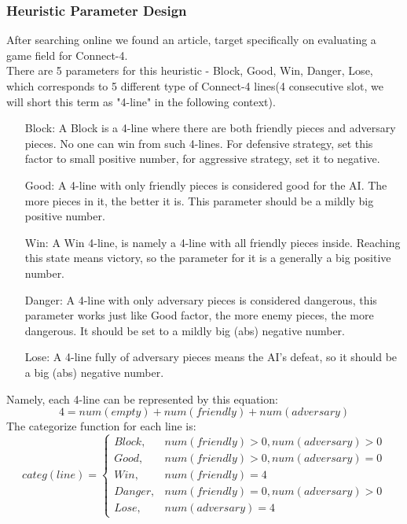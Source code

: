 \documentclass[12pt,a4paper]{article}
\begin{document}
	\subsubsection{Heuristic Parameter Design}
	After searching online we found an article, target specifically on evaluating a game field for Connect-4.\\
	
	There are 5 parameters for this heuristic - Block, Good, Win, Danger, Lose, which corresponds to 5 different type of Connect-4 lines(4 consecutive slot, we will short this term as "4-line" in the following context).\\
	
	
	\begin{enumerate}
		\item [Block:] A Block is a 4-line where there are both friendly pieces and adversary pieces. No one can win from such 4-lines. For defensive strategy, set this factor to small positive number, for aggressive strategy, set it to negative.
		\item [Good:] A 4-line with only friendly pieces is considered good for the AI. The more pieces in it, the better it is. This parameter should be a mildly big positive number.
		\item [Win:] A Win 4-line, is namely a 4-line with all friendly pieces inside. Reaching this state means victory, so the parameter for it is a generally a big positive number.
		\item [Danger:] A 4-line with only adversary pieces is considered dangerous, this parameter works just like Good factor, the more enemy pieces, the more dangerous. It should be set to a mildly big (abs) negative number.
		\item [Lose:] A 4-line fully of adversary pieces means the AI's defeat, so it should be a big (abs) negative number.
	\end{enumerate}

	Namely, each 4-line can be represented by this equation:
	\begin{displaymath}
		4 = num(empty) + num(friendly) + num(adversary)
	\end{displaymath}
	The categorize function for each line is:
	$$categ(line)=
	\begin{cases}
	Block, & num(friendly) > 0 , num(adversary) > 0\\
	Good, & num(friendly) > 0 , num(adversary) = 0\\
	Win, & num(friendly) = 4\\
	Danger, & num(friendly) = 0 , num(adversary) > 0\\
	Lose, & num(adversary) = 4
	\end{cases}
	$$
\end{document}
